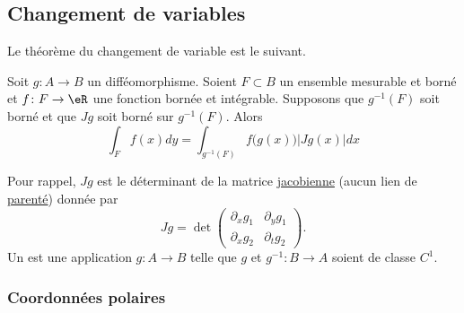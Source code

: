 \subsection{Changement de variables}


Le théorème du changement de variable est le suivant.
\begin{theorem}
Soit $g\colon A\to B$ un difféomorphisme. Soient $F\subset B$ un ensemble mesurable et borné et $f\colon F\to \eR$ une fonction bornée et intégrable. Supposons que $g^{-1}(F)$ soit borné et que $Jg$ soit borné sur $g^{-1}(F)$. Alors
\begin{equation}
    \int_Ff(x)dy=\int_{g^{-1}(F)}f\big( g(x) \big)| Jg(x) |dx
\end{equation}
\end{theorem}
Pour rappel, $Jg$ est le déterminant de la matrice \href{http://fr.wikipedia.org/wiki/Matrice_jacobienne}{jacobienne} (aucun lien de \href{http://fr.wikipedia.org/wiki/Jacob}{parenté}) donnée par
\begin{equation}
	Jg=\det\begin{pmatrix}
	\partial_xg_1	&	\partial_yg_1	\\
	\partial_xg_2	&	\partial_tg_2
\end{pmatrix}.
\end{equation}
Un  est une application $g\colon A\to B$ telle que $g$ et $g^{-1}\colon B\to A$ soient de classe $C^1$.

					\subsubsection{Coordonnées polaires}

